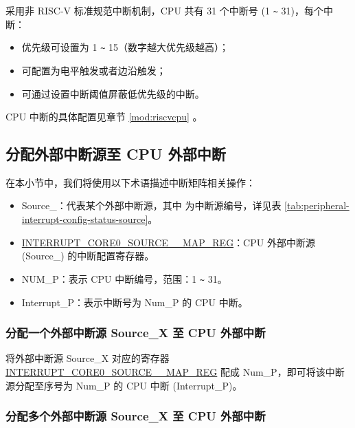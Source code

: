 \documentclass[main\_\_CN.tex]{subfiles}
\begin{document}
\chipname{} 采用非 RISC-V 标准规范中断机制，CPU 共有 31 个中断号 (1 \verb+~+ 31)，每个中断：
\begin{itemize}
    \item 优先级可设置为 1 \verb+~+ 15（数字越大优先级越高）；
    \item 可配置为电平触发或者边沿触发；
    \item 可通过设置中断阈值屏蔽低优先级的中断。
\end{itemize}

\begin{tiplisting}
CPU 中断的具体配置见章节 \ref{mod:riscvcpu} \textit{}。
\end{tiplisting}







\subsection{分配外部中断源至 CPU 外部中断}

在本小节中，我们将使用以下术语描述中断矩阵相关操作：
\begin{itemize}

\item Source\_：代表某个外部中断源，其中  为中断源编号，详见表 \ref{tab:peripheral-interrupt-config-status-source}。

\item \hyperref[regdesc:INTERRUPTCORE0CACHECORE0ACSINTMAPREG]{INTERRUPT\_CORE0\_SOURCE\_\_MAP\_REG}：CPU 外部中断源 (Source\_) 的中断配置寄存器。
\item NUM\_P：表示 CPU 中断编号，范围：1 \verb+~+ 31。
\item Interrupt\_P：表示中断号为 Num\_P 的 CPU 中断。

\end{itemize}

\subsubsection{分配一个外部中断源 Source\_X 至 CPU 外部中断}

将外部中断源 Source\_X 对应的寄存器 \hyperref[regdesc:INTERRUPTCORE0CACHECORE0ACSINTMAPREG]{INTERRUPT\_CORE0\_SOURCE\_\_MAP\_REG} 配成 Num\_P，即可将该中断源分配至序号为 Num\_P 的 CPU 中断 (Interrupt\_P)。

\subsubsection{分配多个外部中断源 Source\_X 至 CPU 外部中断}
\end{document}
